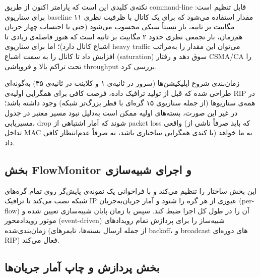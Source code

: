 \documentclass{article}
\begin{document}
	نکته‌ی کلیدی این است که پارامتر  اکنون از طریق command-line قابل تنظیم است: برای سناریوی baseline مقدار  استفاده می‌شود که برای یک کانال  با ظرفیت نظری ۱۱ مگابیت بر ثانیه، بار نسبتاً سبکی محسوب می‌شود (حتی با احتساب چهار جریان هم‌زمان، بار تجمعی نظری حدود ۲ مگابیت بر ثانیه است که هنوز فاصله‌ی زیادی تا اشباع کانال دارد)؛ اما برای سناریوی heavy traffic می‌توان این مقدار را به‌مراتب افزایش داد تا کانال را به سمت اشباع (saturation) سوق دهد و رفتار CSMA/CA را تحت تراکم بالا و فروپاشی throughput بررسی کرد.
	
	زمان‌بندی شروع اپلیکیشن‌ها (سرور در ثانیه‌ی ۱ و کلاینت در ثانیه‌ی ۳۵) به‌گونه‌ای طراحی شده که قبل از تولید ترافیک داده، فرصت کافی برای همگرایی اولیه‌ی RIP در همه‌ی سناریوها (از جمله سناریوی ۱۵ گره‌ای با قطر بزرگ‌تر شبکه) وجود داشته باشد؛ در غیر این صورت، بسته‌های اولیه ممکن است به‌دلیل نبود مسیر معتبر در جدول مسیریابی، drop شوند که آمار اشتباهی از packet loss واقعی (که باید صرفاً ناشی از تداخل MAC یا کندی همگرایی ساختاری باشد، نه صرفاً عدم‌انتظار کافی) به ما خواهد داد.
	
	\subsection{بخش FlowMonitor و اجرای شبیه‌سازی}
	
	\lr{}
	
	این بخش ساختار  را تنظیم می‌کند و با فراخوانی  یک نمونه‌ی پایش‌گر روی تمام گره‌های شبکه نصب می‌کند تا ترافیک IP عبوری از هر گره را شنود و آمار جریان‌به‌جریان (per-flow) آن را در طول کل اجرا ضبط کند. سپس با  زمان پایان شبیه‌سازی تعیین شده و  موتور رویداد‌محور (event-driven) شبیه‌ساز را برای پردازش تمام رویدادهای زمان‌بندی‌شده (از جمله ارسال بسته‌ها، تایمرهای backoff، و broadcast های دوره‌ای RIP) فعال می‌کند.
	
	\subsection{بخش پردازش و چاپ آمار جریان‌ها}
	
	\lr{}
	
\end{document}
